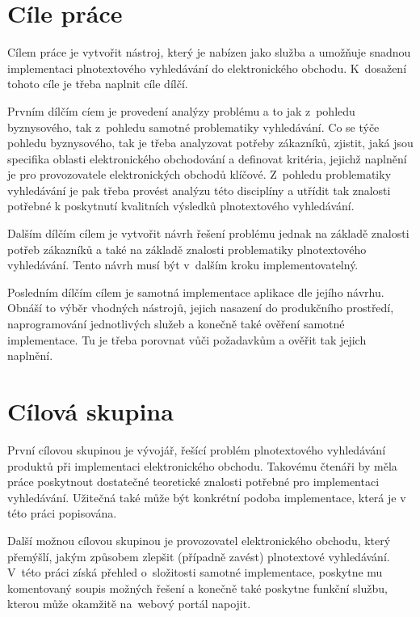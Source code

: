 \documentclass[FM,DP]{tulthesis}
\begin{document}
\section{Cíle práce}

Cílem práce je vytvořit nástroj, který je nabízen jako služba a umožňuje snadnou implementaci
plnotextového vyhledávání do elektronického obchodu. K~dosažení tohoto cíle je třeba naplnit cíle dílčí.

Prvním dílčím cíem je provedení analýzy problému a to jak z~pohledu byznysového, tak
z~pohledu samotné problematiky vyhledávání. Co se týče pohledu byznysového, tak je třeba
analyzovat potřeby zákazníků, zjistit, jaká jsou specifika oblasti elektronického obchodování
a definovat kritéria, jejichž naplnění je pro provozovatele elektronických obchodů klíčové. 
Z~pohledu problematiky vyhledávání je pak třeba provést analýzu této disciplíny a utřídit
tak znalosti potřebné k poskytnutí kvalitních výsledků plnotextového vyhledávání.

Dalším dílčím cílem je vytvořit návrh řešení problému jednak na základě znalosti potřeb
zákazníků a také na základě znalosti problematiky plnotextového vyhledávání. Tento návrh musí 
být v~dalším kroku implementovatelný.

Posledním dílčím cílem je samotná implementace aplikace dle jejího návrhu. Obnáší to výběr 
vhodných nástrojů, jejich nasazení do produkčního prostředí, naprogramování jednotlivých
služeb a konečně také ověření samotné implementace. Tu je třeba porovnat vůči požadavkům
a ověřit tak jejich naplnění.

\section{Cílová skupina}

První cílovou skupinou je vývojář, řešící problém plnotextového vyhledávání produktů 
při implementaci elektronického obchodu. Takovému čtenáři by měla práce poskytnout dostatečné
teoretické znalosti potřebné pro implementaci vyhledávání. Užitečná také může být konkrétní
podoba implementace, která je v této práci popisována.

Další možnou cílovou skupinou je provozovatel elektronického obchodu, který přemýšlí, 
jakým způsobem zlepšit (případně zavést) plnotextové vyhledávání. V~této práci získá 
přehled o~složitosti samotné implementace, poskytne mu komentovaný soupis možných řešení 
a konečně také poskytne funkční službu, kterou může okamžitě na~webový portál napojit.
\end{document}
